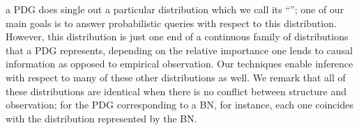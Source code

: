 {%
a PDG does single out a particular distribution which we call its ``\obslimit'';
one of our main goals 
is to answer probabilistic queries with respect to this distribution.
%
However, 
this distribution is just 
one end 
of a continuous family of distributions that a PDG represents,
depending on the relative importance one lends to 
    causal information as opposed to empirical observation.
Our techniques enable inference with respect to 
    many of these other distributions as well.
We remark that all of these distributions are identical
when there is no conflict between structure and observation;
for the PDG corresponding to a BN, for instance, each one
coincides with the distribution represented by the BN.
}


